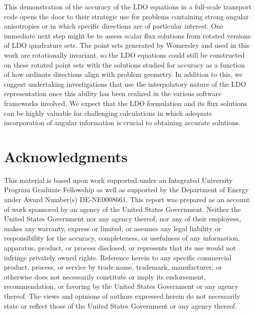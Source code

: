 \documentclass{article} %
\begin{document}
This demonstration of the accuracy of the LDO equations in a full-scale
transport code opens the door to their strategic use for problems containing
strong angular anisotropies or in which specific directions are of particular
interest. One immediate next step might be to assess scalar flux solutions
from rotated versions of LDO quadrature sets. The point sets generated by
Womersley and used in this work are rotationally invariant, so the LDO
equations could still be constructed on these rotated point sets with the
solutions studied for accuracy as a function of how ordinate directions align
with problem geometry. In addition to this, we suggest undertaking
investigations that use the interpolatory nature of the LDO representation
once this ability has been realized in the various software frameworks
involved. We expect that the LDO formulation and its flux solutions can be
highly valuable for challenging calculations in which adequate incorporation
of angular information is crucial to obtaining accurate solutions.

\pagebreak
\section*{Acknowledgments}

This material is based upon work supported under an Integrated
University Program Graduate Fellowship as well as supported by the Department 
of Energy under Award Number(s) DE-NE0008661. This report was prepared as an
account of work sponsored by an agency of the United States Government.
Neither the United States Government nor any agency thereof, nor any of their
employees, makes any warranty, express or limited, or assumes any legal
liability or responsibility for the accuracy, completeness, or usefulness of
any information, apparatus, product, or process disclosed, or represents that
its use would not infringe privately owned rights. Reference herein to any 
specific commercial product, process, or service by trade name, trademark, 
manufacturer, or otherwise does not necessarily constitute or imply its 
endorsement, recommendation, or favoring by the United States Government or
any agency thereof. The views and opinions of authors expressed herein do not 
necessarily state or reflect those of the United States Government or any 
agency thereof.

\pagebreak



\end{document}
